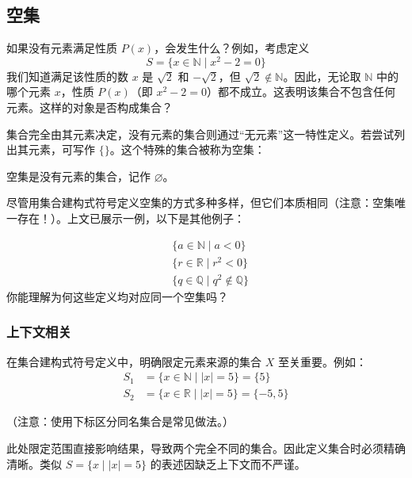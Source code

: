 \subsection{空集}

如果没有元素满足性质 $P(x)$，会发生什么？例如，考虑定义
\[S = \{x \in \mathbb{N} \mid x^2 - 2 = 0\}\]
我们知道满足该性质的数 $x$ 是 $\sqrt{2}$ 和 $-\sqrt{2}$，但 $\sqrt{2} \notin \mathbb{N}$。因此，无论取 $\mathbb{N}$ 中的哪个元素 $x$，性质 $P(x)$（即 $x^2 - 2 = 0$）都不成立。这表明该集合不包含任何元素。这样的对象是否构成集合？

集合完全由其元素决定，没有元素的集合则通过``无元素''这一特性定义。若尝试列出其元素，可写作 $\{\}$。这个特殊的集合被称为空集：

\begin{definition}
    空集是没有元素的集合，记作 $\varnothing$。
\end{definition}

尽管用集合建构式符号定义空集的方式多种多样，但它们本质相同（注意：空集唯一存在！）。上文已展示一例，以下是其他例子：

\begin{align*}
    &\{a \in \mathbb{N} \mid a < 0\} \\
    &\{r \in \mathbb{R} \mid r^2 < 0\} \\
    &\{q \in \mathbb{Q} \mid q^2 \notin \mathbb{Q}\}
\end{align*}
你能理解为何这些定义均对应同一个空集吗？

\subsubsection*{上下文相关}

在集合建构式符号定义中，明确限定元素来源的集合 $X$ 至关重要。例如：
\begin{align*}
    S_1 &= \{x \in \mathbb{N} \mid |x| = 5\} = \{5\}\\
    S_2 &= \{x \in \mathbb{R} \mid |x| = 5\} = \{-5, 5\}
\end{align*}

（注意：使用下标区分同名集合是常见做法。）

此处限定范围直接影响结果，导致两个完全不同的集合。因此定义集合时必须精确清晰。类似 $S = \{x \mid |x| = 5\}$ 的表述因缺乏上下文而不严谨。
